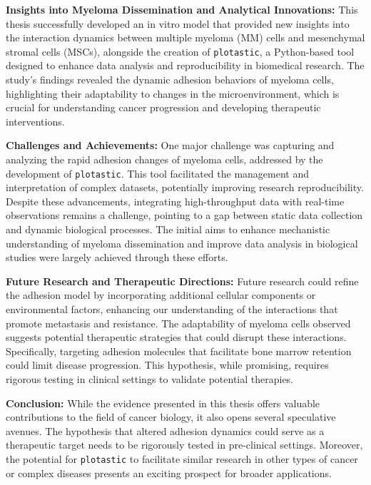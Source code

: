 

%
\label{sec:discussion_overall_conclusion}%
%
\textbf{Insights into Myeloma Dissemination and Analytical Innovations:}
This thesis successfully developed an in vitro model that provided new insights
into the interaction dynamics between multiple myeloma (MM) cells and
mesenchymal stromal cells (MSCs), alongside the creation of \texttt{plotastic},
a Python-based tool designed to enhance data analysis and reproducibility in
biomedical research. The study's findings revealed the dynamic adhesion
behaviors of myeloma cells, highlighting their adaptability to changes in the
microenvironment, which is crucial for understanding cancer progression and
developing therapeutic interventions.

\textbf{Challenges and Achievements:}
One major challenge was capturing and analyzing the rapid adhesion changes of
myeloma cells, addressed by the development of \texttt{plotastic}. This tool
facilitated the management and interpretation of complex datasets, potentially
improving research reproducibility. Despite these advancements, integrating
high-throughput data with real-time observations remains a challenge, pointing
to a gap between static data collection and dynamic biological processes. The
initial aims to enhance mechanistic understanding of myeloma dissemination and
improve data analysis in biological studies were largely achieved through these
efforts.

\textbf{Future Research and Therapeutic Directions:}
Future research could refine the adhesion model by incorporating additional
cellular components or environmental factors, enhancing our understanding of the
interactions that promote metastasis and resistance. The adaptability of myeloma
cells observed suggests potential therapeutic strategies that could disrupt
these interactions. Specifically, targeting adhesion molecules that facilitate
bone marrow retention could limit disease progression. This hypothesis,
while promising, requires rigorous testing in clinical settings to validate
potential therapies.

\textbf{Conclusion:}
While the evidence presented in this thesis offers valuable contributions to the
field of cancer biology, it also opens several speculative avenues. The
hypothesis that altered adhesion dynamics could serve as a therapeutic target
needs to be rigorously tested in pre-clinical settings. Moreover, the potential for
\texttt{plotastic} to facilitate similar research in other types of cancer or complex
diseases presents an exciting prospect for broader applications.

